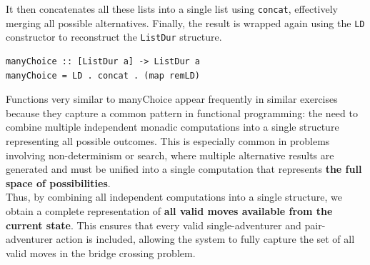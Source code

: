 \documentclass[a4paper,12pt]{report}
\begin{document}
It then concatenates all these lists into a single list using \texttt{concat},
effectively merging all possible alternatives. Finally, the result is wrapped
again using the \texttt{LD} constructor to reconstruct the \texttt{ListDur}
structure.
\begin{verbatim}
manyChoice :: [ListDur a] -> ListDur a
manyChoice = LD . concat . (map remLD)
\end{verbatim}
Functions very similar to manyChoice appear frequently in similar
exercises because they capture a common pattern in functional programming:
the need to combine multiple independent monadic computations into a single
structure representing all possible outcomes. This is especially common in
problems
involving non-determinism or search, where multiple alternative results are
generated and must be unified into a single computation that represents
\textbf{the full space of possibilities}.
\\[1em]
Thus, by combining all independent computations into a single structure,
we obtain a complete representation of \textbf{all valid moves available from
the current state}. This ensures that every valid single-adventurer
and pair-adventurer action is included, allowing the system to fully
capture the set of all valid moves in the bridge crossing problem.
\end{document}
